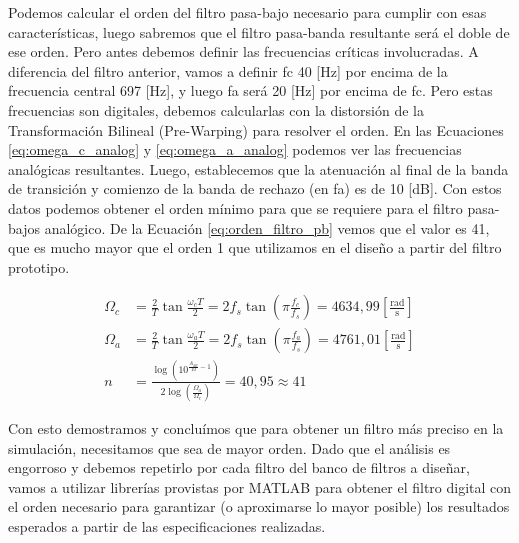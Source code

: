 Podemos calcular el orden del filtro pasa-bajo necesario para cumplir con esas características, luego sabremos que el filtro pasa-banda resultante será el doble de ese orden. Pero antes debemos definir las frecuencias críticas involucradas. A diferencia del filtro anterior, vamos a definir \gls{fc} 40 [Hz] por encima de la frecuencia central 697 [Hz], y luego \gls{fa} será 20 [Hz] por encima de \gls{fc}. Pero estas frecuencias son digitales, debemos calcularlas con la distorsión de la Transformación Bilineal (Pre-Warping) para resolver el orden. En las Ecuaciones \ref{eq:omega_c_analog} y \ref{eq:omega_a_analog} podemos ver las frecuencias analógicas resultantes. Luego, establecemos que la atenuación al final de la banda de transición y comienzo de la banda de rechazo (en \gls{fa}) es de 10 [dB]. Con estos datos podemos obtener el orden mínimo para que se requiere para el filtro pasa-bajos analógico. De la Ecuación \ref{eq:orden_filtro_pb} vemos que el valor es 41, que es mucho mayor que el orden 1 que utilizamos en el diseño a partir del filtro prototipo.

\begin{align}
  \Omega_c & = \frac{2}{T} \tan \frac{\omega_c T}{2} = 2 f_s \tan\left(\pi \frac{f_c}{f_s}\right) = 4634,99 \mathrm{\left[\frac{rad}{s}\right]} \label{eq:omega_c_analog} \\
  \Omega_a & = \frac{2}{T} \tan \frac{\omega_a T}{2} = 2 f_s \tan\left(\pi \frac{f_a}{f_s}\right) = 4761,01 \mathrm{\left[\frac{rad}{s}\right]} \label{eq:omega_a_analog} \\
  n        & = \frac{\log\left(10^{\frac{A_{dB}}{10}-1}\right)}{2\log\left(\frac{\Omega_a}{\Omega_c}\right)} = 40,95 \approx 41 \label{eq:orden_filtro_pb}
\end{align}

Con esto demostramos y concluímos que para obtener un filtro más preciso en la simulación, necesitamos que sea de mayor orden. Dado que el análisis es engorroso y debemos repetirlo por cada filtro del banco de filtros a diseñar, vamos a utilizar librerías provistas por MATLAB para obtener el filtro digital con el orden necesario para garantizar (o aproximarse lo mayor posible) los resultados esperados a partir de las especificaciones realizadas.

